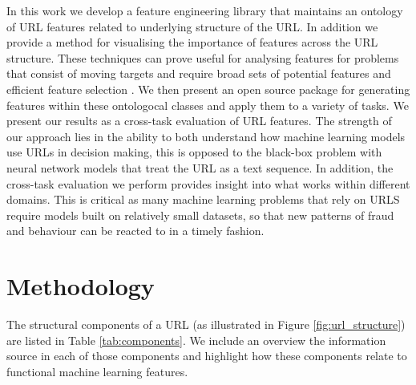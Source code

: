 \documentclass{aircc}
\begin{document}
In this work we develop a feature engineering library that maintains an ontology of URL features
related to underlying structure of the URL. In addition we provide a method for visualising the importance of features
across the URL structure. These techniques can prove useful for analysing features for problems that
consist of moving targets and require broad sets of potential features and efficient feature selection \cite{Basnet2012}.
We then present an open source package for generating features within these
ontologocal classes and apply them to a variety of tasks. We present our results as a
cross-task evaluation of URL features. The strength of our approach lies in the ability to both understand how
machine learning models use URLs in decision making, this is opposed to the black-box problem with neural network
models that treat the URL as a text sequence. In addition, the cross-task evaluation we perform provides insight into
what works within different domains. This is critical as many machine learning problems that rely on URLS require
models built on relatively small datasets, so that new patterns of fraud and behaviour can be reacted to in a timely
fashion.

\section{Methodology}

The structural components of a URL (as illustrated in Figure \ref{fig:url_structure}) are listed in Table \ref{tab:components}.
We include an overview the information source in each of those components and highlight how these components relate to
functional machine learning features.
\end{document}
